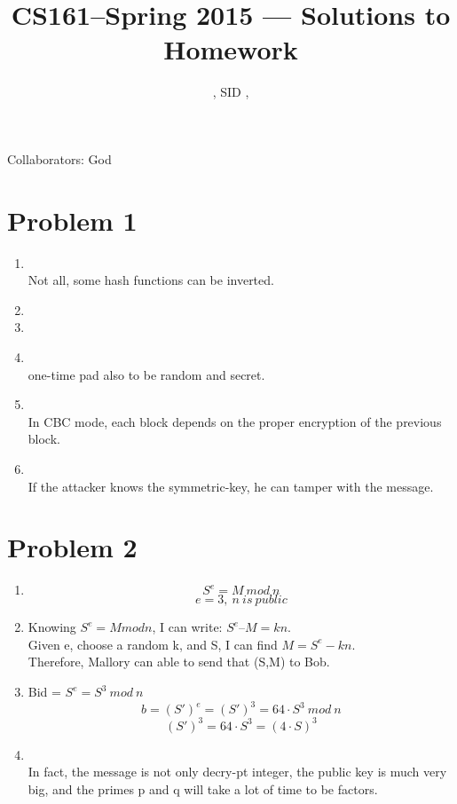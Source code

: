\documentclass[11pt]{article}
\title{CS161--Spring 2015 --- Solutions to Homework \Homework}
\author{\Name, SID \SID, \texttt{\Login}}
\newenvironment{qparts}{\begin{enumerate}[{(}a{)}]}{\end{enumerate}}
\begin{document}
\maketitle

Collaborators: God

\section*{Problem 1}

\begin{qparts}
\item
{}\\
Not all, some hash functions can be inverted.
\item
{}
\item
{}

\item
{}\\
one-time pad also to be random and secret.

\item
{}\\
In CBC mode, each block depends on the proper encryption of the previous block.
\item
{}\\
If the attacker knows the symmetric-key, he can tamper with the message.
\end{qparts}


\newpage
\section*{Problem 2}
\begin{qparts}
\item
$$S^e = M\ mod\ n$$ $$e = 3,\ n\ is\ public$$
\item
Knowing $S^e = M mod n$, I can write: $S^e – M = kn.$\\
Given e, choose a random k, and S, I can find $M = S^e - kn.$\\
Therefore, Mallory can able to send that (S,M) to Bob.


\item
Bid = $S^e = S^3\ mod\ n$
$$b = (S')^e = (S')^3 = 64\cdot S^3\ mod\ n $$
$$(S')^3 = 64\cdot S^3 = (4\cdot S)^3$$

\item
{}\\
In fact, the message is not only decry-pt integer, the public key is much very big, and the primes p and q will take a lot of time to be factors.

\end{qparts}
\newpage
\end{document}
